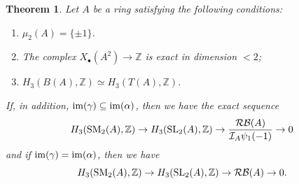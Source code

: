 \documentclass[11pt]{amsart}
\theoremstyle{definition}
\theoremstyle{plain}
\newtheorem{thm}[ntn]{Theorem}
\numberwithin{equation}{section}
\newcommand{\z}{\mathbb{Z}}
\newcommand{\II}{\mathcal{I}}
\newcommand{\RB}{\mathcal{RB}}
\newcommand{\SL}{\mathit{{\rm SL}}}
\newcommand{\SM}{\mathit{{\rm SM}}}
\newcommand{\im}{{\rm im}}
\begin{document}
\begin{thm}
    \label{thm-main-1}
    Let $A$ be a ring satisfying the following conditions:
    \begin{enumerate}
        \item $\mu_2(A)=\{\pm 1\}$.
        \item The complex $X_{\bullet}(A^2)\to\z$ is exact in dimension $<2$;
        \item $H_3(B(A),\z)\simeq H_3(T(A),\z)$.
    \end{enumerate}

    If, in addition, $\im(\gamma)\subseteq\im(\alpha)$, then we have the exact sequence
    \[
        H_3(\SM_2(A),\z)\to H_3(\SL_2(A),\z)\to \frac{\RB(A)}{\II_A\psi_1(-1)}\to 0
    \]
    and if $\im(\gamma)=\im(\alpha)$, then we have
    \[
        H_3(\SM_2(A),\z)\to H_3(\SL_2(A),\z)\to \RB(A)\to 0.
    \]
\end{thm}
\end{document}
